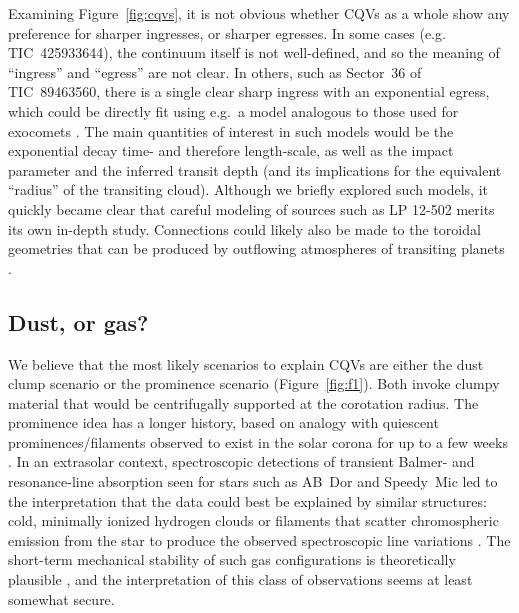 \documentclass[11pt,twocolumn,tighten]{aastex63}
\begin{document}
Examining Figure~\ref{fig:cqvs}, it is not obvious whether CQVs as a
whole show any preference for sharper ingresses, or sharper egresses.
In some cases (e.g. TIC~425933644), the continuum itself is not
well-defined, and so the meaning of ``ingress'' and ``egress'' are not
clear.  In others, such as Sector~36 of TIC~89463560, there is a
single clear sharp ingress with an exponential egress, which could be
directly fit using e.g.~a model analogous to those used for exocomets
\citep[e.g.][]{2019A&A...625L..13Z}.  The main quantities of interest
in such models would be the exponential decay time- and therefore
length-scale, as well as the impact parameter and the inferred transit
depth (and its implications for the equivalent ``radius'' of the
transiting cloud).  Although we briefly explored such models, it
quickly became clear that careful modeling of sources such as LP
12-502 merits its own in-depth study.  Connections could likely also
be made to the toroidal geometries that can be produced by outflowing
atmospheres of transiting planets
\citep[e.g.][]{2019ApJ...873...89M,2022ApJ...926..226M}.



\subsection{Dust, or gas?}

We believe that the most likely scenarios to explain CQVs are either
the dust clump scenario or the prominence scenario
(Figure~\ref{fig:f1}).  Both invoke clumpy material that would be
centrifugally supported at the corotation radius.  The prominence idea
has a longer history, based on analogy with quiescent
prominences/filaments observed to exist in the solar corona for up to
a few weeks \citep[see][]{2015ASSL..415.....V}.  In an extrasolar
context, spectroscopic detections of transient Balmer- and
resonance-line absorption seen for stars such as AB~Dor and Speedy~Mic
\citep[e.g.][]{1989MNRAS.238..657C,1993MNRAS.262..369J,2006MNRAS.365..530D,2016MNRAS.463..965L}
led to the interpretation that the data could best be explained by
similar structures: cold, minimally ionized hydrogen clouds or
filaments that scatter chromospheric emission from the star to produce
the observed spectroscopic line variations
\citep[see][]{1989MNRAS.238..657C}.  The short-term mechanical
stability of such gas configurations is theoretically plausible
\citep{2000MNRAS.316..647F,2022MNRAS.514.5465W}, and the
interpretation of this class of observations seems at least somewhat
secure.
\end{document}
